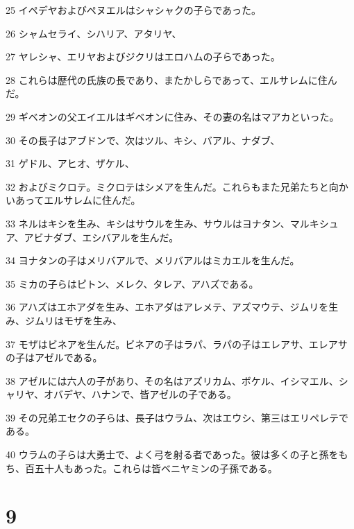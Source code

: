 \par 25 イペデヤおよびペヌエルはシャシャクの子らであった。
\par 26 シャムセライ、シハリア、アタリヤ、
\par 27 ヤレシャ、エリヤおよびジクリはエロハムの子らであった。
\par 28 これらは歴代の氏族の長であり、またかしらであって、エルサレムに住んだ。
\par 29 ギベオンの父エイエルはギベオンに住み、その妻の名はマアカといった。
\par 30 その長子はアブドンで、次はツル、キシ、バアル、ナダブ、
\par 31 ゲドル、アヒオ、ザケル、
\par 32 およびミクロテ。ミクロテはシメアを生んだ。これらもまた兄弟たちと向かいあってエルサレムに住んだ。
\par 33 ネルはキシを生み、キシはサウルを生み、サウルはヨナタン、マルキシュア、アビナダブ、エシバアルを生んだ。
\par 34 ヨナタンの子はメリバアルで、メリバアルはミカエルを生んだ。
\par 35 ミカの子らはピトン、メレク、タレア、アハズである。
\par 36 アハズはエホアダを生み、エホアダはアレメテ、アズマウテ、ジムリを生み、ジムリはモザを生み、
\par 37 モザはビネアを生んだ。ビネアの子はラパ、ラパの子はエレアサ、エレアサの子はアゼルである。
\par 38 アゼルには六人の子があり、その名はアズリカム、ボケル、イシマエル、シャリヤ、オバデヤ、ハナンで、皆アゼルの子である。
\par 39 その兄弟エセクの子らは、長子はウラム、次はエウシ、第三はエリペレテである。
\par 40 ウラムの子らは大勇士で、よく弓を射る者であった。彼は多くの子と孫をもち、百五十人もあった。これらは皆ベニヤミンの子孫である。

\chapter{9}

